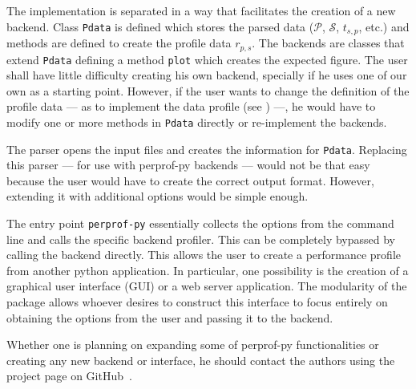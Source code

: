 The implementation is separated in a way that facilitates the creation of a
new backend.
Class {\tt Pdata} is defined which stores the parsed data ($\mathcal{P}$,
$\mathcal{S}$, $t_{s,p}$, etc.) and  methods are defined to create the profile data
$r_{p,s}$.
The backends are classes that extend {\tt Pdata} defining a method {\tt plot}
which creates the expected figure.
The user shall have little difficulty creating his own backend, specially if he
uses one of our own as a starting point.
However, if the user wants to change the definition of the profile data --- as
to implement the data profile (see \cite{bib:more2009benchmarking}) ---, he would have to modify
one or more methods in {\tt Pdata} directly or re-implement the backends.

The parser opens the input files and creates the information for {\tt Pdata}.
Replacing this parser --- for use with perprof-py backends --- would not be that easy
because the user would have to create the correct output format.  However,
extending it with additional options would be simple enough.

The entry point {\tt perprof-py} essentially collects the options from the command
line and calls the specific backend profiler. This can be completely bypassed
by calling the backend directly. This allows the user to create a performance
profile from another python application. In particular, one possibility is the
creation of a graphical user interface (GUI)
or a web server application. The modularity of the package
allows whoever desires to construct this interface to focus entirely on
obtaining the options from the user and passing it to the backend.

Whether one is planning on expanding some of perprof-py functionalities or creating any
new backend or interface, he should contact the authors using the project page on
GitHub~\cite{url:perprof-py}.

